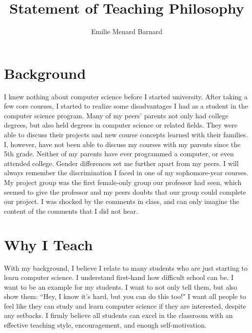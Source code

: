 \documentclass[12pt]{amsart} \usepackage{amssymb}
\title[]{Statement of Teaching Philosophy}
\author[]{Emilie Menard Barnard}
\begin{document}
\maketitle
\thispagestyle{empty}

\section*{Background}
\noindent I knew nothing about computer science before I started university. After taking a few core courses, I started to realize some disadvantages I had as a student in the computer science program. Many of my peers' parents not only had college degrees, but also held degrees in computer science or related fields. They were able to discuss their projects and new course concepts learned with their families. I, however, have not been able to discuss my courses with my parents since the 5th grade. Neither of my parents have ever programmed a computer, or even attended college. Gender differences set me further apart from my peers. I will always remember the discrimination I faced in one of my sophomore-year courses. My project group was the first female-only group our professor had seen, which seemed to give the professor and my peers doubts that our group could complete our project. I was shocked by the comments in class, and can only imagine the content of the comments that I did not hear.

\section*{Why I Teach}
\noindent With my background, I believe I relate to many students who are just starting to learn computer science. I understand first-hand how difficult school can be. I want to be an example for my students. I want to not only tell them, but also show them: ``Hey, I know it’s hard, but you can do this too!" I want all people to feel like they can study and learn computer science if they are interested, despite any setbacks. I firmly believe all students can excel in the classroom with an effective teaching style, encouragement, and enough self-motivation.
\end{document}
